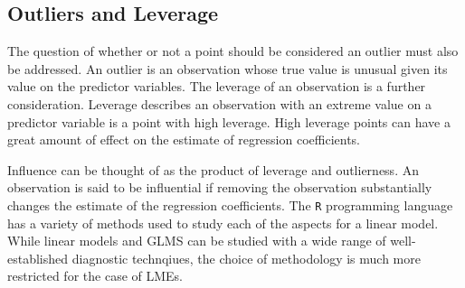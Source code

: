 \documentclass[12pt, a4paper]{report}
\theoremstyle{plain}
\theoremstyle{definition}
\theoremstyle{remark}
\begin{document}
%
%
%
%
















\subsection{Outliers and Leverage}



The question of whether or not a point should be considered an outlier must also be addressed. An outlier is an observation whose true value is unusual given its value on the predictor variables. The leverage of an observation is a further consideration. Leverage describes an observation with an extreme value on a predictor variable is a point with high leverage. High leverage points can have a great amount of effect on the estimate of regression coefficients.

Influence can be thought of as the product of leverage and outlierness. An observation is said to be influential if removing the observation substantially changes the estimate of the regression coefficients. The \texttt{R} programming language has a variety of methods used to study each of the aspects for a linear model. While linear models and GLMS can be studied with a wide range of well-established diagnostic technqiues, the choice of methodology is much more restricted for the case of LMEs.
\end{document}
